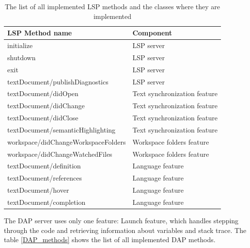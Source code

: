 \begin{longtable}{ll}
	\caption{The list of all implemented LSP methods and the classes where they are implemented}
	\label{LSP_methods}   \\ \toprule
	\textbf{LSP Method name} & \textbf{Component} \\ \midrule
	initialize  & LSP server     \\
	shutdown    & LSP server     \\
	exit        & LSP server    \\
	textDocument/publishDiagnostics & LSP server \\
	textDocument/didOpen  &  Text synchronization feature    \\
	textDocument/didChange  & Text synchronization feature     \\
	textDocument/didClose  &  Text synchronization feature    \\
	textDocument/semanticHighlighting & Text synchronization feature \\
	workspace/didChangeWorkspaceFolders  & Workspace folders feature     \\
	workspace/didChangeWatchedFiles  & Workspace folders feature     \\
	textDocument/definition  & Language feature     \\
	textDocument/references  & Language feature     \\
	textDocument/hover  & Language feature     \\
	textDocument/completion  & Language feature     \\ \bottomrule
\end{longtable}

The DAP server uses only one feature: Launch feature, which handles stepping through the code and retrieving information about variables and stack trace. The table \cref{DAP_methods} shows the list of all implemented DAP methods.

